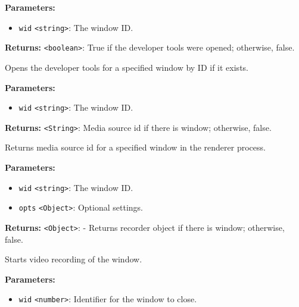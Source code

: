 \documentclass[12pt,a4paper]{article}
\begin{document}
\noindent \textbf{Parameters:}
\begin{itemize}
  \item \texttt{wid} \texttt{<string>}: The window ID.
\end{itemize}

\noindent \textbf{Returns:} \texttt{<boolean>}: True if the developer tools were opened; otherwise, false.

\noindent Opens the developer tools for a specified window by ID if it exists.

\vspace{5mm}
\noindent {}


\noindent \textbf{Parameters:}
\begin{itemize}
  \item \texttt{wid} \texttt{<string>}: The window ID.
\end{itemize}

\noindent \textbf{Returns:} \texttt{<String>}: Media source id if there is window; otherwise, false.

\noindent Returns media source id for a specified window in the renderer process.

\vspace{5mm}
\noindent {}


\noindent \textbf{Parameters:}
\begin{itemize}
  \item \texttt{wid} \texttt{<string>}: The window ID.
  \item \texttt{opts} \texttt{<Object>}: Optional settings.
\end{itemize}

\noindent \textbf{Returns:} \texttt{<Object>}: - Returns recorder object if there is window; otherwise, false.

\noindent Starts video recording of the window.

\vspace{5mm}
\noindent {}


\noindent \textbf{Parameters:}
\begin{itemize}
  \item \texttt{wid} \texttt{<number>}: Identifier for the window to close.
\end{itemize}
\end{document}
